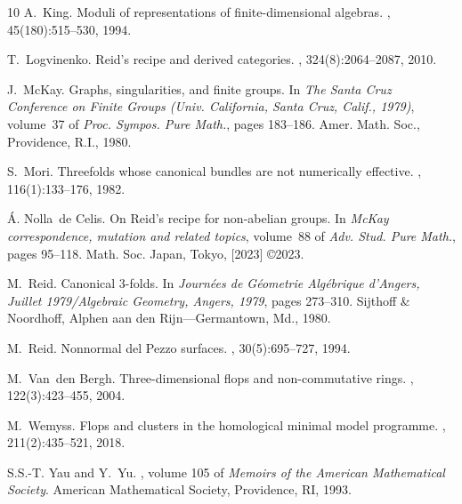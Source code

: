 \documentclass[11pt,reqno]{amsart}
\numberwithin{equation}{section}
\theoremstyle{definition}
\newcommand{\0}{\operatorname{0}}
\begin{document}
{\begin{thebibliography}{10}
A.~King.
\newblock Moduli of representations of finite-dimensional algebras.
, 45(180):515--530, 1994.

T.~Logvinenko.
\newblock Reid's recipe and derived categories.
, 324(8):2064--2087, 2010.

J.~McKay.
\newblock Graphs, singularities, and finite groups.
\newblock In {\em The {S}anta {C}ruz {C}onference on {F}inite {G}roups ({U}niv.
  {C}alifornia, {S}anta {C}ruz, {C}alif., 1979)}, volume~37 of {\em Proc.
  Sympos. Pure Math.}, pages 183--186. Amer. Math. Soc., Providence, R.I.,
  1980.

S.~Mori.
\newblock Threefolds whose canonical bundles are not numerically effective.
, 116(1):133--176, 1982.

\'A. Nolla~de Celis.
\newblock On {R}eid's recipe for non-abelian groups.
\newblock In {\em Mc{K}ay correspondence, mutation and related topics},
  volume~88 of {\em Adv. Stud. Pure Math.}, pages 95--118. Math. Soc. Japan,
  Tokyo, [2023] \copyright 2023.

M.~Reid.
\newblock Canonical {$3$}-folds.
\newblock In {\em Journ\'ees de {G}\'eometrie {A}lg\'ebrique d'{A}ngers,
  {J}uillet 1979/{A}lgebraic {G}eometry, {A}ngers, 1979}, pages 273--310.
  Sijthoff \& Noordhoff, Alphen aan den Rijn---Germantown, Md., 1980.

M.~Reid.
\newblock Nonnormal del {P}ezzo surfaces.
, 30(5):695--727, 1994.

M.~Van~den Bergh.
\newblock Three-dimensional flops and non-commutative rings.
, 122(3):423--455, 2004.

M.~Wemyss.
\newblock Flops and clusters in the homological minimal model programme.
, 211(2):435--521, 2018.

S.S.-T. Yau and Y.~Yu.
, volume
  105 of {\em Memoirs of the American Mathematical Society}.
\newblock American Mathematical Society, Providence, RI, 1993.

\end{thebibliography}
%
}
\end{document}
